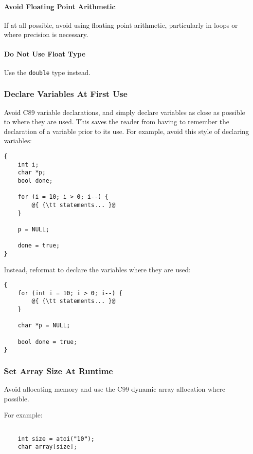 \documentclass[fleqn,12pt]{PARCOneColumn} %
\begin{document}
\paragraph{Avoid Floating Point Arithmetic}
If at all possible, avoid using floating point arithmetic, particularly in loops or where precision is necessary.

\paragraph{Do Not Use Float Type}
Use the {\tt double} type instead.

\subsubsection{Declare Variables At First Use}
Avoid C89 variable declarations, and simply declare variables as close as possible to where they are used. This saves the reader from having to remember the declaration of a variable prior to its use. For example, avoid this style of declaring variables:
\begin{lstlisting}[backgroundcolor=\color{badCodeColor}]
{
	int i;
	char *p;
	bool done;

	for (i = 10; i > 0; i--) {
		@{ {\tt statements... }@
	}

	p = NULL;

	done = true;
}
\end{lstlisting}

Instead, reformat to declare the variables where they are used:

\begin{lstlisting}
{
	for (int i = 10; i > 0; i--) {
		@{ {\tt statements... }@
	}

	char *p = NULL;

	bool done = true;
}
\end{lstlisting}

\subsubsection{Set Array Size At Runtime}
Avoid allocating memory and use the C99 dynamic array allocation where possible.

For example:
 
\begin{lstlisting}

    int size = atoi("10");
    char array[size];

\end{lstlisting}
\end{document}
